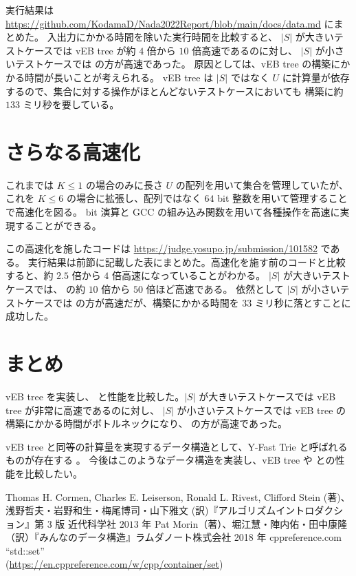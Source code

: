 \documentclass[dvipdfmx,a4j,10pt]{jarticle}
\begin{document}
実行結果は \url{https://github.com/KodamaD/Nada2022Report/blob/main/docs/data.md} にまとめた。
入出力にかかる時間を除いた実行時間を比較すると、
$|S|$ が大きいテストケースでは vEB tree が約 $4$ 倍から $10$ 倍高速であるのに対し、
$|S|$ が小さいテストケースでは  の方が高速であった。
原因としては、vEB tree の構築にかかる時間が長いことが考えられる。
vEB tree は $|S|$ ではなく $U$ に計算量が依存するので、集合に対する操作がほとんどないテストケースにおいても
構築に約 $133$ ミリ秒を要している。

\section{さらなる高速化}

これまでは $K \leq 1$ の場合のみに長さ $U$ の配列を用いて集合を管理していたが、
これを $K \leq 6$ の場合に拡張し、配列ではなく $64$ bit 整数を用いて管理することで高速化を図る。
bit 演算と GCC の組み込み関数を用いて各種操作を高速に実現することができる。

この高速化を施したコードは \url{https://judge.yosupo.jp/submission/101582} である。
実行結果は前節に記載した表にまとめた。高速化を施す前のコードと比較すると、約 $2.5$ 倍から $4$ 倍高速になっていることがわかる。
$|S|$ が大きいテストケースでは、 の約 $10$ 倍から $50$ 倍ほど高速である。
依然として $|S|$ が小さいテストケースでは  の方が高速だが、構築にかかる時間を $33$ ミリ秒に落とすことに成功した。
\section{まとめ}

vEB tree を実装し、 と性能を比較した。$|S|$ が大きいテストケースでは vEB tree が非常に高速であるのに対し、
$|S|$ が小さいテストケースでは vEB tree の構築にかかる時間がボトルネックになり、 の方が高速であった。

vEB tree と同等の計算量を実現するデータ構造として、Y-Fast Trie と呼ばれるものが存在する \cite{Data}。
今後はこのようなデータ構造を実装し、vEB tree や  との性能を比較したい。

\begin{thebibliography}{9}
   Thomas H. Cormen, Charles E. Leiserson, Ronald L. Rivest, Clifford Stein (著)、浅野哲夫・岩野和生・梅尾博司・山下雅文 (訳)『アルゴリズムイントロダクション』第 $3$ 版 近代科学社 $2013$ 年
   Pat Morin（著）、堀江慧・陣内佑・田中康隆（訳）『みんなのデータ構造』ラムダノート株式会社 2018 年
   cppreference.com ``std::set''  \\ (\url{https://en.cppreference.com/w/cpp/container/set})
\end{thebibliography}
\end{document}
